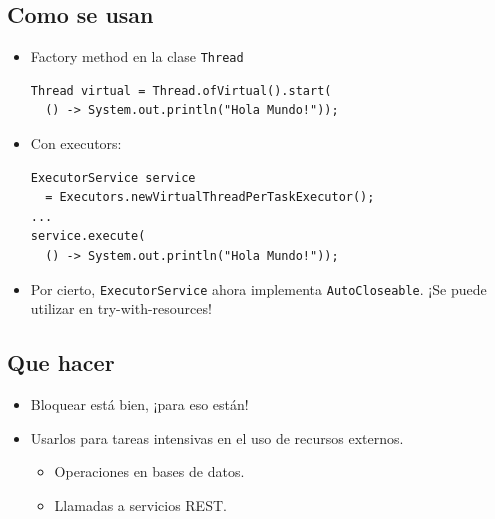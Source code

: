 \documentclass{presentacion}
\begin{document}
\subsection{Como se usan}
\begin{frame}[fragile]
    \begin{itemize}
        \item Factory method en la clase \texttt{Thread}
        \begin{verbatim}
Thread virtual = Thread.ofVirtual().start(
  () -> System.out.println("Hola Mundo!"));
        \end{verbatim}
        \item Con executors:
        \begin{verbatim}
ExecutorService service 
  = Executors.newVirtualThreadPerTaskExecutor();
...
service.execute( 
  () -> System.out.println("Hola Mundo!"));
        \end{verbatim}
        \item Por cierto, \texttt{ExecutorService} ahora implementa \texttt{AutoCloseable}.
        ¡Se puede utilizar en try-with-resources!
    \end{itemize}
\end{frame}



\subsection{Que hacer}
\begin{frame}
 \begin{itemize}[<+->]
  \item Bloquear está bien, ¡para eso están!
  \item Usarlos para tareas intensivas en el uso de recursos externos.
  \begin{itemize}
   \item Operaciones en bases de datos.
   \item Llamadas a servicios REST.
   
  \end{itemize}

 \end{itemize}
\end{frame}
\end{document}
